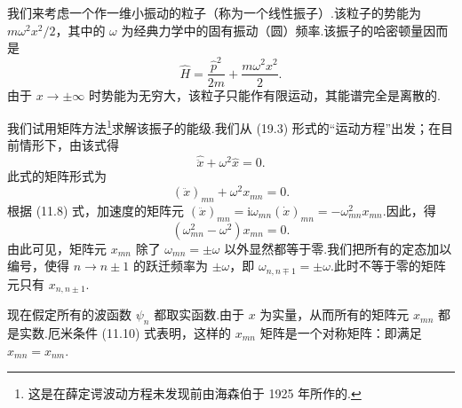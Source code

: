 我们来考虑一个作一维小振动的粒子（称为一个线性振子）.该粒子的势能为 $m\omega^2x^2/2$，其中的 $\omega$ 为经典力学中的固有振动（圆）频率.该振子的哈密顿量因而是
\begin{equation}
  \hat{H}=\frac{\hat{p}^2}{2m}+\frac{m\omega^2x^2}{2}.
\end{equation}
由于 $x\to\pm\infty$ 时势能为无穷大，该粒子只能作有限运动，其能谱完全是离散的.

我们试用矩阵方法\footnote{这是在薛定谔波动方程未发现前由海森伯于 1925 年所作的.}求解该振子的能级.我们从 (19.3) 形式的“运动方程”出发；在目前情形下，由该式得
\begin{equation}
  \hat{\ddot{x}}+\omega^2\hat{x}=0.
\end{equation}
此式的矩阵形式为
\begin{equation*}
  \left(\ddot{x}\right)_{mn}+\omega^2 x_{mn}=0.
\end{equation*}
根据 (11.8) 式，加速度的矩阵元
$\left(\ddot{x}\right)_{mn}=\mathrm{i}\omega_{mn}\left(\dot{x}\right)_{mn}=-\omega_{mn}^2 x_{mn}$.因此，得
\begin{equation*}
  \left(\omega_{mn}^2-\omega^2\right)x_{mn}=0.
\end{equation*}
由此可见，矩阵元 $x_{mn}$ 除了 $\omega_{mn}=\pm\omega$ 以外显然都等于零.我们把所有的定态加以编号，使得 $n\to n\pm 1$ 的跃迁频率为 $\pm\omega$，即 $\omega_{n,n\mp 1}=\pm\omega$.此时不等于零的矩阵元只有 $x_{n,n\pm 1}$.

现在假定所有的波函数 $\psi_n$ 都取实函数.由于 $x$ 为实量，从而所有的矩阵元 $x_{mn}$ 都是实数.厄米条件 (11.10) 式表明，这样的 $x_{mn}$ 矩阵是一个对称矩阵：即满足 $x_{mn}=x_{nm}$.

